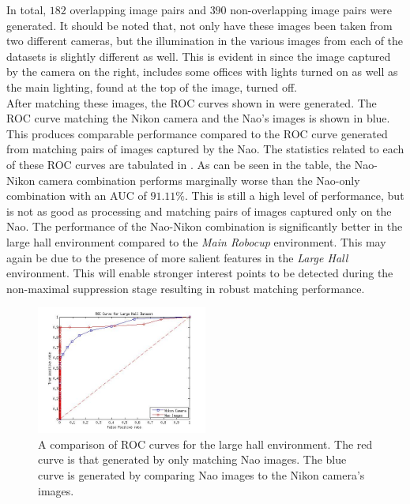 \documentclass[11pt]{report}
\begin{document}
In total, $182$ overlapping image pairs and $390$ non-overlapping image pairs were generated. It should be noted that, not only have these images been taken from two different cameras, but the illumination in the various images from each of the datasets is slightly different as well. This is evident in   since the image captured by the camera on the right, includes some offices with lights turned on as well as the main lighting, found at the top of the image, turned off. \\

After matching these images, the ROC curves shown in  were generated. The ROC curve matching the Nikon camera and the Nao's images is shown in blue. This produces comparable performance compared to the ROC curve generated from matching pairs of images captured by the Nao. The statistics related to each of these ROC curves are tabulated in . As can be seen in the table, the Nao-Nikon camera combination performs marginally worse than the Nao-only combination with an AUC of $91.11\%$. This is still a high level of performance, but is not as good as processing and matching pairs of images captured only on the Nao. The performance of the Nao-Nikon combination is significantly better in the large hall environment compared to the \textit{Main Robocup} environment. This may again be due to the presence of more salient features in the \textit{Large Hall} environment. This will enable stronger interest points to be detected during the non-maximal suppression stage resulting in robust matching performance.\\ 


 \begin{figure}[h!] 
  \centering
    \includegraphics[width=0.5\textwidth]{../Drawings/camera/ROC_dataset3.jpg}
    \caption{A comparison of ROC curves for the large hall environment. The red curve is that generated by only matching Nao images. The blue curve is generated by comparing Nao images to the Nikon camera's images. }
    \label{fig:rocLargeHallNikon}
\end{figure}
\end{document}
